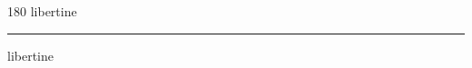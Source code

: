
\begin{frame}
\begin{center}
\begin{turn}{180}
{\fontsize{2.5cm}{1em}\selectfont libertine}
\end{turn}
\vspace{1em}\par  
\hrule
\vspace{1em}\par  
{\fontsize{2.5cm}{1em}\selectfont libertine}
\end{center}
\end{frame}
